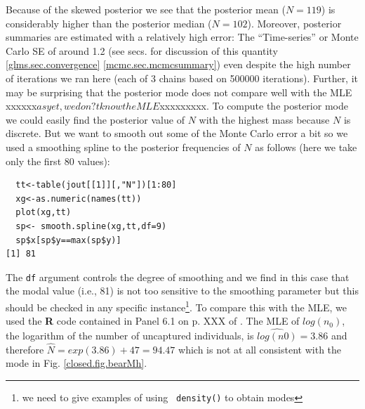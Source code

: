 Because of the skewed posterior we see that the posterior mean
($N=119$) is considerably higher than the posterior median
($N=102$). Moreover, posterior summaries are estimated with a
relatively high error: The ``Time-series'' or Monte Carlo SE of around
1.2 (see secs.  for discussion of this quantity
\ref{glms.sec.convergence} \ref{mcmc.sec.mcmcsummary}) even despite
the high number of iterations we ran here (each of 3 chains based on
500000 iterations).  Further, it may be surprising that the posterior
mode does not compare well with the MLE xxxxxx$as yet, we don?t know the MLE$xxxxxxxxx. To compute the posterior mode
we could easily find the posterior value of $N$ with the highest mass
because $N$ is discrete. But we want to smooth out some of the Monte
Carlo error a bit so we used a smoothing spline to the posterior
frequencies of $N$ as follows (here we take only the first 80 values):
\begin{verbatim}
  tt<-table(jout[[1]][,"N"])[1:80] 
  xg<-as.numeric(names(tt))
  plot(xg,tt)
  sp<- smooth.spline(xg,tt,df=9)
  sp$x[sp$y==max(sp$y)]
[1] 81
\end{verbatim}
The \mbox{\tt df} argument controls the degree of smoothing and we
find in this case that the modal value (i.e., 81) is not too sensitive
to the smoothing parameter but this should be checked in any specific
instance\footnote{we need to give examples of using \mbox{\tt
    density()} to obtain modes}.
To compare this with the MLE, we used 
the {\bf R} code contained in Panel 6.1 on p. XXX of \citet{royle_dorazio:2008}.  The
MLE of $log(n_{0})$, the logarithm of the number of uncaptured
individuals, is $\widehat{log(n0)} = 3.86$ and therefore $\hat{N} =
exp(3.86)+47 = 94.47$ which is not at all consistent with the 
mode in 
Fig. \ref{closed.fig.bearMh}.


